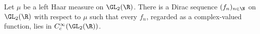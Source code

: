 Let $\mu$ be a left Haar measure on $\GL_2(\R)$. There is a Dirac sequence $(f_n)_{n\in\N}$ on $\GL_2(\R)$ with
respect to $\mu$ such that every $f_n$, regarded as a complex-valued function, lies in $C_c^\infty(\GL_2(\R))$.
